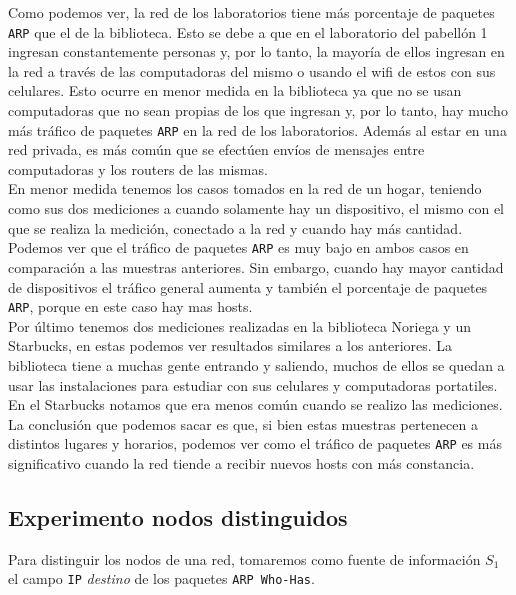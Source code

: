Como podemos ver, la red de los laboratorios tiene más porcentaje de paquetes \texttt{ARP} que el de la biblioteca. Esto se debe a que en el laboratorio del pabellón 1 ingresan
constantemente personas y, por lo tanto, la mayoría de ellos ingresan en la red a través de las computadoras del mismo o usando el wifi de estos con sus celulares. Esto
ocurre en menor medida en la biblioteca ya que no se usan computadoras que no sean propias de los que ingresan y, por lo tanto, hay mucho más tráfico de paquetes \texttt{ARP} en la red
de los laboratorios. Además al estar en una red privada, es más común que se efectúen envíos de mensajes entre computadoras y los routers de las mismas.\\

En menor medida tenemos los casos tomados en la red de un hogar, teniendo como sus dos mediciones a cuando solamente hay un dispositivo, el mismo con el que se realiza la medición,
conectado a la red y cuando hay más cantidad. Podemos ver que el tráfico de paquetes \texttt{ARP} es muy bajo en ambos casos en comparación a las muestras anteriores. Sin embargo,
cuando hay mayor cantidad de dispositivos el tráfico general aumenta y también el porcentaje de paquetes \texttt{ARP}, porque en este caso hay mas hosts.\\

Por último tenemos dos mediciones realizadas en la biblioteca Noriega y un Starbucks, en estas podemos ver resultados similares a los anteriores. La biblioteca tiene a muchas
gente entrando y saliendo, muchos de ellos se quedan a usar las instalaciones para estudiar con sus celulares y computadoras portatiles. En el Starbucks notamos que era menos
común cuando se realizo las mediciones.\\

La conclusión que podemos sacar es que, si bien estas muestras pertenecen a distintos lugares y horarios, podemos ver como el tráfico de paquetes \texttt{ARP} es más significativo cuando
la red tiende a recibir nuevos hosts con más constancia.



\subsection{Experimento nodos distinguidos}

Para distinguir los nodos de una red, tomaremos como fuente de información $S_1$ el campo
\texttt{IP} \textit{destino} de los paquetes \texttt{ARP Who-Has}.


